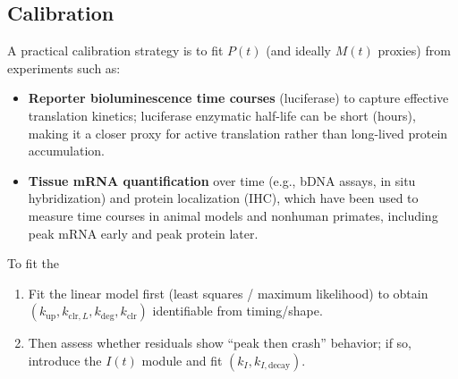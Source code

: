 \subsection*{Calibration}

A practical calibration strategy is to fit $P(t)$ (and ideally $M(t)$ proxies) from experiments such as:
\begin{itemize}
    \item \textbf{Reporter bioluminescence time courses} (luciferase) to capture effective translation kinetics; luciferase enzymatic half-life can be short (hours), making it a closer proxy for active translation rather than long-lived protein accumulation.
    \item \textbf{Tissue mRNA quantification} over time (e.g., bDNA assays, in situ hybridization) and protein localization (IHC), which have been used to measure time courses in animal models and nonhuman primates, including peak mRNA early and peak protein later.
\end{itemize}

To fit the 
\begin{enumerate}[label=\arabic*.]
    \item Fit the linear model first (least squares / maximum likelihood) to obtain $(k_{\mathrm{up}}, k_{\mathrm{clr},L}, k_{\mathrm{deg}}, k_{\mathrm{clr}})$ identifiable from timing/shape.
    \item Then assess whether residuals show ``peak then crash'' behavior; if so, introduce the $I(t)$ module and fit $(k_I, k_{I,\mathrm{decay}})$.
\end{enumerate}
